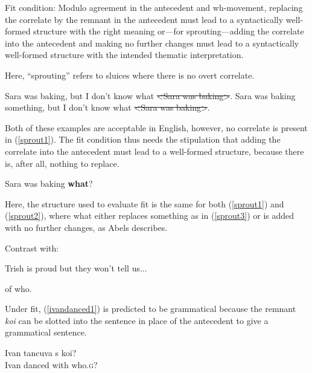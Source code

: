 \documentclass{turabian-researchpaper}
\begin{document}
\begin{exe}
\ex\label{fitcond} Fit condition: Modulo agreement in the antecedent and wh-movement, replacing the correlate by the remnant in the antecedent must lead to a syntactically well-formed structure with the right meaning or---for sprouting---adding the correlate into the antecedent and making no further changes must lead to a syntactically well-formed structure with the intended thematic interpretation. 
\end{exe}

Here, ``sprouting'' refers to sluices where there is no overt correlate. 

\begin{exe}
\ex
\begin{xlist}
\ex\label{sprout1} Sara was baking, but I don't know what \sout{\textless Sara was baking\textgreater}.
\ex\label{sprout2} Sara was baking something, but I don't know what \sout{\textless Sara was baking\textgreater}.
\end{xlist}
\end{exe} 

Both of these examples are acceptable in English, however, no correlate is present in (\ref{sprout1}). The fit condition thus needs the stipulation that adding the correlate into the antecedent must lead to a well-formed structure, because there is, after all, nothing to replace. 

\begin{exe}
\ex\label{sprout3} Sara was baking \textbf{what}? 
\end{exe}

Here, the structure used to evaluate fit is the same for both (\ref{sprout1}) and (\ref{sprout2}), where what either replaces something as in (\ref{sprout3}) or is added with no further changes, as Abels describes. 

Contrast with:
\begin{exe}
\ex\label{trishisproud} Trish is proud but they won't tell us...
\begin{xlist}
\ex of who.
\end{xlist}
\end{exe}

Under fit, (\ref{ivandanced1}) is predicted to be grammatical because the remnant \textit{koi} can be slotted into the sentence in place of the antecedent to give a grammatical sentence. 

\begin{exe}
\ex\label{ivandanced6}
\gll Ivan tancuva s      koi? \\ 
 Ivan danced   with who.\textsc{g}? \\
 \end{exe}
 
\end{document}
